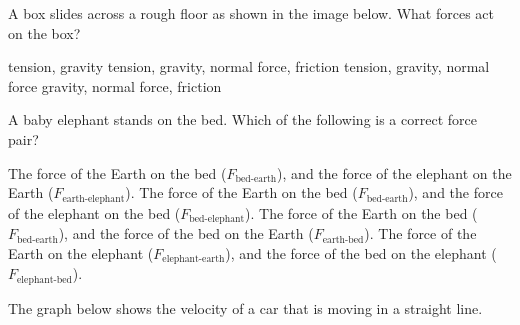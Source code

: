 \documentclass[answers]{exam}
\begin{document}
\begin{questions}


\question %
A box slides across a rough floor as shown in the image below.  What forces act on the box?

\begin{center}
\end{center}


\begin{randomizechoices}
    \choice tension, gravity
    \correctchoice tension, gravity, normal force, friction
    \choice tension, gravity, normal force
    \choice gravity, normal force, friction
\end{randomizechoices}

\question 
A baby elephant stands on the bed. Which of the following is a correct force pair?


\begin{center}
\end{center}

\begin{randomizechoices}
    \choice The force of the Earth on the bed ($F_\text{bed-earth}$), and the force of the elephant on the Earth ($F_\text{earth-elephant}$).
    \choice The force of the Earth on the bed ($F_\text{bed-earth}$), and the force of the elephant on the bed ($F_\text{bed-elephant}$).
    \correctchoice The force of the Earth on the bed ($F_\text{bed-earth}$), and the force of the bed on the Earth ($F_\text{earth-bed}$).
    \choice The force of the Earth on the elephant ($F_\text{elephant-earth}$), and the force of the bed on the elephant ($F_\text{elephant-bed}$).
    
\end{randomizechoices}

\clearpage
\question
The graph below shows the velocity of a car that is moving in a straight line.


\end{questions}
\end{document}
